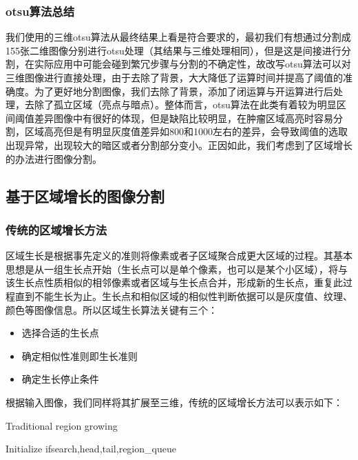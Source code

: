 \documentclass[UTF8]{ctexart}
\begin{document}
\subsubsection{otsu算法总结}

	我们使用的三维otsu算法从最终结果上看是符合要求的，最初我们有想通过分割成155张二维图像分别进行otsu处理（其结果与三维处理相同），但是这是间接进行分割，在实际应用中可能会碰到繁冗步骤与分割的不确定性，故改写otsu算法可以对三维图像进行直接处理，由于去除了背景，大大降低了运算时间并提高了阈值的准确度。为了更好地分割图像，我们去除了背景，添加了闭运算与开运算进行后处理，去除了孤立区域（亮点与暗点）。整体而言，otsu算法在此类有着较为明显区间阈值差异图像中有很好的体现，但是缺陷比较明显，在肿瘤区域高亮时容易分割，区域高亮但是有明显灰度值差异如800和1000左右的差异，会导致阈值的选取出现异常，出现较大的暗区或者分割部分变小。正因如此，我们考虑到了区域增长的办法进行图像分割。




\subsection{基于区域增长的图像分割}
\subsubsection{传统的区域增长方法}
区域生长是根据事先定义的准则将像素或者子区域聚合成更大区域的过程。其基本思想是从一组生长点开始（生长点可以是单个像素，也可以是某个小区域），将与该生长点性质相似的相邻像素或者区域与生长点合并，形成新的生长点，重复此过程直到不能生长为止。生长点和相似区域的相似性判断依据可以是灰度值、纹理、颜色等图像信息。所以区域生长算法关键有三个：
\begin{itemize}
    \item 选择合适的生长点
	\item 确定相似性准则即生长准则
	\item 确定生长停止条件
\end{itemize}
根据输入图像，我们同样将其扩展至三维，传统的区域增长方法可以表示如下：

\begin{algorithm}[H]
	\caption{Traditional region growing}\label{algorithm}
    Initialize ifsearch,head,tail,region\_queue\;
    
\end{algorithm}
\end{document}
